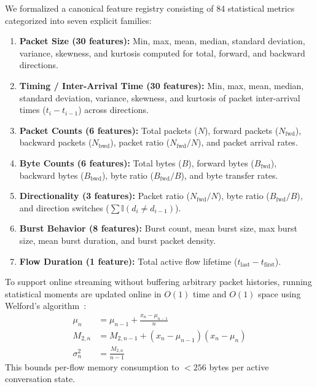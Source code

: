 \documentclass[conference]{IEEEtran}
\begin{document}
We formalized a canonical feature registry consisting of 84 statistical metrics categorized into seven explicit families:
\begin{enumerate}
    \item \textbf{Packet Size (30 features):} Min, max, mean, median, standard deviation, variance, skewness, and kurtosis computed for total, forward, and backward directions.
    \item \textbf{Timing / Inter-Arrival Time (30 features):} Min, max, mean, median, standard deviation, variance, skewness, and kurtosis of packet inter-arrival times ($t_i - t_{i-1}$) across directions.
    \item \textbf{Packet Counts (6 features):} Total packets ($N$), forward packets ($N_{\text{fwd}}$), backward packets ($N_{\text{bwd}}$), packet ratio ($N_{\text{fwd}} / N$), and packet arrival rates.
    \item \textbf{Byte Counts (6 features):} Total bytes ($B$), forward bytes ($B_{\text{fwd}}$), backward bytes ($B_{\text{bwd}}$), byte ratio ($B_{\text{fwd}} / B$), and byte transfer rates.
    \item \textbf{Directionality (3 features):} Packet ratio ($N_{\text{fwd}} / N$), byte ratio ($B_{\text{fwd}} / B$), and direction switches ($\sum \mathbb{I}(d_i \ne d_{i-1})$).
    \item \textbf{Burst Behavior (8 features):} Burst count, mean burst size, max burst size, mean burst duration, and burst packet density.
    \item \textbf{Flow Duration (1 feature):} Total active flow lifetime ($t_{\text{last}} - t_{\text{first}}$).
\end{enumerate}

To support online streaming without buffering arbitrary packet histories, running statistical moments are updated online in $O(1)$ time and $O(1)$ space using Welford's algorithm~\cite{welford1962note}:
\begin{align}
    \mu_n &= \mu_{n-1} + \frac{x_n - \mu_{n-1}}{n} \\
    M_{2,n} &= M_{2,n-1} + (x_n - \mu_{n-1})(x_n - \mu_n) \\
    \sigma_n^2 &= \frac{M_{2,n}}{n - 1}
\end{align}
This bounds per-flow memory consumption to $< 256$ bytes per active conversation state.
\end{document}
